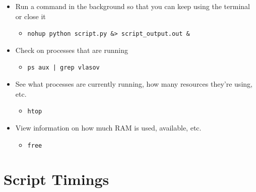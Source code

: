 \documentclass[11pt,a4paper]{report}
\begin{document}
\begin{itemize}

\item Run a command in the background so that you can keep using the terminal or close it
  \begin{itemize}
  \item \texttt{nohup python script.py \&> script\_output.out \&}
  \end{itemize}

\item Check on processes that are running
  \begin{itemize}
  \item \texttt{ps aux | grep vlasov}
  \end{itemize}

\item See what processes are currently running, how many resources they're using, etc.
  \begin{itemize}
  \item \texttt{htop}
  \end{itemize}

\item View information on how much RAM is used, available, etc.
  \begin{itemize}
  \item \texttt{free}
  \end{itemize}

\end{itemize}


\section{Script Timings}
\label{sec:script-timings}
\end{document}
